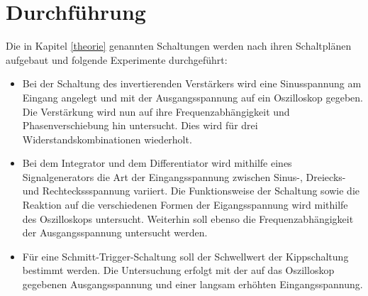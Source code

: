 \section{Durchführung}
Die in Kapitel \ref{theorie} genannten Schaltungen werden nach ihren Schaltplänen aufgebaut und folgende Experimente durchgeführt:
\begin{itemize}
\item Bei der Schaltung des invertierenden Verstärkers wird eine Sinusspannung am Eingang angelegt und mit der Ausgangsspannung auf ein Oszilloskop gegeben. Die Verstärkung wird nun auf ihre Frequenzabhängigkeit und Phasenverschiebung hin untersucht. Dies wird für drei Widerstandskombinationen wiederholt.
\item Bei dem Integrator und dem Differentiator wird mithilfe eines Signalgenerators die Art der Eingangsspannung zwischen Sinus-, Dreiecks- und Rechteckssspannung variiert. Die Funktionsweise der Schaltung sowie die Reaktion auf die verschiedenen Formen der Eigangsspannung wird mithilfe des Oszilloskops untersucht. Weiterhin soll ebenso die Frequenzabhängigkeit der Ausgangsspannung untersucht werden.
\item Für eine Schmitt-Trigger-Schaltung soll der Schwellwert der Kippschaltung bestimmt werden. Die Untersuchung erfolgt mit der auf das Oszilloskop gegebenen Ausgangsspannung und einer langsam erhöhten Eingangsspannung.
\end{itemize}
